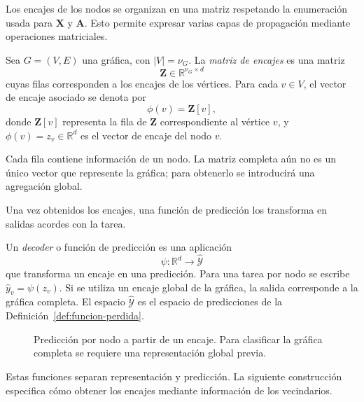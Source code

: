 Los encajes de los nodos se organizan en una matriz respetando la enumeración usada para $\mathbf X$ y $\mathbf A$. Esto permite expresar varias capas de propagación mediante operaciones matriciales.

\begin{definition}
\label{def:matriz-encajes}
    Sea $G = (V, E)$ una gráfica, con $|V| = \nu_G$.
    La \emph{matriz de encajes} es una matriz
    \[
        \mathbf{Z} \in \mathbb{R}^{\nu_G \times d}
    \]
    cuyas filas corresponden a los encajes de los vértices.
    Para cada $v \in V$, el vector de encaje asociado se denota por
    \[
        \phi(v) = \mathbf{Z}[v],
    \]
    donde $\mathbf{Z}[v]$ representa la fila de $\mathbf{Z}$ correspondiente al vértice $v$, y $\phi(v) = z_v \in \mathbb{R}^d$ es el vector de encaje del nodo $v$.
\end{definition}
Cada fila contiene información de un nodo. La matriz completa aún no es un único vector que represente la gráfica; para obtenerlo se introducirá una agregación global.

Una vez obtenidos los encajes, una función de predicción los transforma en salidas acordes con la tarea.

\begin{definition}[Decoder]
\label{def:decoder}
Un \emph{decoder} o función de predicción es una aplicación
\[
\psi:\mathbb R^d\longrightarrow\widehat{\mathcal Y}
\]
que transforma un encaje en una predicción. Para una tarea por nodo se escribe $\hat y_v=\psi(z_v)$. Si se utiliza un encaje global de la gráfica, la salida corresponde a la gráfica completa. El espacio $\widehat{\mathcal Y}$ es el espacio de predicciones de la Definición~\ref{def:funcion-perdida}.
\end{definition}

\begin{figure}[H]
\centering
{}
\caption{Predicción por nodo a partir de un encaje. Para clasificar la gráfica completa se requiere una representación global previa.}
\end{figure}

Estas funciones separan representación y predicción. La siguiente construcción especifica cómo obtener los encajes mediante información de los vecindarios.

